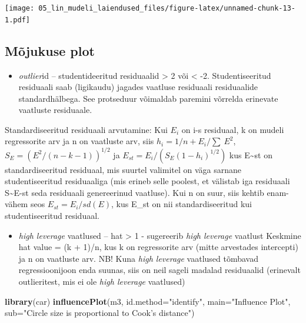 \documentclass[]{book}
\newenvironment{Shaded}{\begin{snugshade}}{\end{snugshade}}
\newcommand{\KeywordTok}[1]{\textcolor[rgb]{0.13,0.29,0.53}{\textbf{#1}}}
\newcommand{\DataTypeTok}[1]{\textcolor[rgb]{0.13,0.29,0.53}{#1}}
\newcommand{\StringTok}[1]{\textcolor[rgb]{0.31,0.60,0.02}{#1}}
\newcommand{\NormalTok}[1]{#1}
\providecommand{\tightlist}{%
  \setlength{\itemsep}{0pt}\setlength{\parskip}{0pt}}
\begin{document}
\texttt{[image: 05\_lin\_mudeli\_laiendused\_files/figure-latex/unnamed-chunk-13-1.pdf]}

\subsection*{Mõjukuse plot}\label{mojukuse-plot}

\begin{itemize}
\tightlist
\item
  \emph{outlier}id -- studentideeritud residuaalid \textgreater{} 2 või
  \textless{} -2. Studentiseeritud residuaali saab (ligikaudu) jagades
  vaatluse residuaali residuaalide standardhälbega. See protseduur
  võimaldab paremini võrrelda erinevate vaatluste residuaale.
\end{itemize}

Standardiseeritud residuaali arvutamine: Kui \(E_i\) on i-s residuaal, k
on mudeli regressorite arv ja n on vaatluste arv, siis
\(h_i = 1/n + E_i/\sum~E^2\), \(S_E = (E^2/(n - k -1))^{1/2}\) ja
\(E_{st} = E_i/(S_E(1 - h_i)^{1/2})\) kus E\textasciitilde{}st on
standardiseeritud residuaal, mis suurtel valimitel on väga sarnane
studentiseeritud residuaaliga (mis erineb selle poolest, et välistab iga
residuaali S\textasciitilde{}E-st seda residuaali genereerinud
vaatluse). Kui n on suur, siis kehtib enam-vähem seos
\(E_{st} = E_i/sd(E)\), kus E\_st on nii standardiseeritud kui
studentiseeritud residuaal.

\begin{itemize}
\tightlist
\item
  \emph{high leverage} vaatlused -- hat \textgreater{} 1 - sugereerib
  \emph{high leverage} vaatlust Keskmine hat value = (k + 1)/n, kus k on
  regressorite arv (mitte arvestades intercepti) ja n on vaatluste arv.
  NB! Kuna \emph{high leverage} vaatlused tõmbavad regressioonijoon enda
  suunas, siis on neil sageli madalad residuaalid (erinevalt
  outlieritest, mis ei ole \emph{high leverage} vaatlused)
\end{itemize}

\begin{Shaded}
\begin{Highlighting}[]
\KeywordTok{library}\NormalTok{(car)}
\KeywordTok{influencePlot}\NormalTok{(m3, }\DataTypeTok{id.method=}\StringTok{"identify"}\NormalTok{, }\DataTypeTok{main=}\StringTok{"Influence Plot"}\NormalTok{,}
              \DataTypeTok{sub=}\StringTok{"Circle size is proportional to Cook's distance"}\NormalTok{)}
\end{Highlighting}
\end{Shaded}
\end{document}
